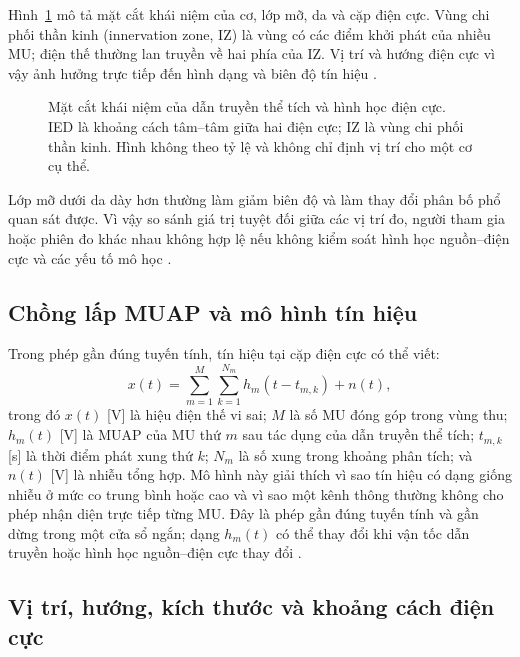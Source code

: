 Hình~\ref{fig:volume-conduction} mô tả mặt cắt khái niệm của cơ, lớp mỡ,
da và cặp điện cực. Vùng chi phối thần kinh (innervation zone, IZ) là vùng
có các điểm khởi phát của nhiều MU; điện thế thường lan truyền về hai phía
của IZ. Vị trí và hướng điện cực vì vậy ảnh hưởng trực tiếp đến hình dạng
và biên độ tín hiệu \cite{campanini2022fundamental,hermens2000development}.

\begin{figure}[htbp]
    \centering
    
    \caption{Mặt cắt khái niệm của dẫn truyền thể tích và hình học điện cực.
    IED là khoảng cách tâm--tâm giữa hai điện cực; IZ là vùng chi phối
    thần kinh. Hình không theo tỷ lệ và không chỉ định vị trí cho một cơ
    cụ thể.}
    \label{fig:volume-conduction}
\end{figure}

Lớp mỡ dưới da dày hơn thường làm giảm biên độ và làm thay đổi phân bố
phổ quan sát được. Vì vậy so sánh giá trị tuyệt đối giữa các vị trí đo,
người tham gia hoặc phiên đo khác nhau không hợp lệ nếu không kiểm soát
hình học nguồn--điện cực và các yếu tố mô học
\cite{campanini2022fundamental,mcmanus2020analysis}.

\subsection{Chồng lấp MUAP và mô hình tín hiệu}
\label{sec:superposition-model}

Trong phép gần đúng tuyến tính, tín hiệu tại cặp điện cực có thể viết:
\begin{equation}
\label{eq:interference-model}
x(t) = \sum_{m=1}^{M} \sum_{k=1}^{N_m}
h_m\!\left(t-t_{m,k}\right)+n(t),
\end{equation}
trong đó $x(t)$ [V] là hiệu điện thế vi sai; $M$ là số MU đóng góp trong
vùng thu; $h_m(t)$ [V] là MUAP của MU thứ $m$ sau tác dụng của dẫn truyền
thể tích; $t_{m,k}$ [s] là thời điểm phát xung thứ $k$; $N_m$ là số xung
trong khoảng phân tích; và $n(t)$ [V] là nhiễu tổng hợp. Mô hình này giải
thích vì sao tín hiệu có dạng giống nhiễu ở mức co trung bình hoặc cao và
vì sao một kênh thông thường không cho phép nhận diện trực tiếp từng MU.
Đây là phép gần đúng tuyến tính và gần dừng trong một cửa sổ ngắn; dạng
$h_m(t)$ có thể thay đổi khi vận tốc dẫn truyền hoặc hình học
nguồn--điện cực thay đổi
\cite{campanini2022fundamental,mcmanus2020analysis}.

\subsection{Vị trí, hướng, kích thước và khoảng cách điện cực}
\label{sec:electrode-geometry}

